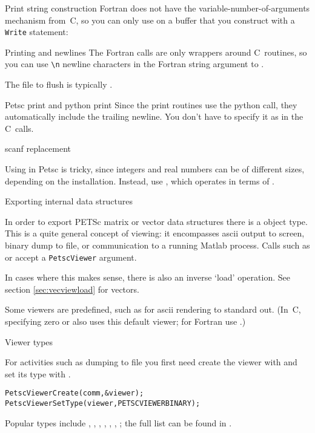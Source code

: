 \begin{fortrannote}{Print string construction}
  Fortran does not have the variable-number-of-arguments mechanism
  from~C, so you can only use 
  on a buffer that you construct with a \lstinline{Write} statement:
\end{fortrannote}

\begin{fortrannote}{Printing and newlines}
  The Fortran calls are only wrappers around C~routines, so you can 
  use \verb+\n+ newline characters in the Fortran string argument
  to .

  The file to flush is typically .
\end{fortrannote}

\begin{pythonnote}{Petsc print and python print}
  Since the print routines use the python  call, they
  automatically include the trailing newline. You don't have to
  specify it as in the C~calls.
\end{pythonnote}

 {scanf replacement}

Using  in Petsc is tricky, since integers and real numbers can be
of different sizes, depending on the installation.
Instead, use , which operates in terms of
.

 {Exporting internal data structures}
\label{sec:petsc-view}

In order to export PETSc matrix or vector data structures
there is a  object type.
This is a quite general concept of viewing: it encompasses ascii output to screen,
binary dump to file, or communication to a running Matlab process.
Calls such as   or 
accept a \lstinline{PetscViewer} argument.

In cases where this makes sense, there is also an inverse `load' operation.
See section \ref{sec:vecviewload} for vectors.

Some viewers are predefined, such as
 for ascii rendering to
standard out. (In~C, specifying zero or  also uses this
default viewer; for Fortran use .)

 {Viewer types}

For activities such as dumping to file
you first need create the viewer
with 
and set its type with .
\begin{lstlisting}
PetscViewerCreate(comm,&viewer);
PetscViewerSetType(viewer,PETSCVIEWERBINARY);  
\end{lstlisting}
Popular types include
,
,
,
,
,
,
;
the full list can be found in .

